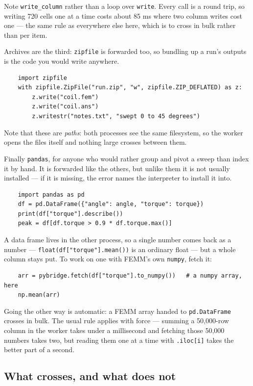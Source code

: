 Note {\tt write\_column} rather than a loop over {\tt write}.  Every call is a
round trip, so writing 720 cells one at a time costs about 85 ms where two
column writes cost one --- the same rule as everywhere else here, which is to
cross in bulk rather than per item.

Archives are the third: {\tt zipfile} is forwarded too, so bundling up a run's
outputs is the code you would write anywhere.

\begin{verbatim}
    import zipfile
    with zipfile.ZipFile("run.zip", "w", zipfile.ZIP_DEFLATED) as z:
        z.write("coil.fem")
        z.write("coil.ans")
        z.writestr("notes.txt", "swept 0 to 45 degrees")
\end{verbatim}

\noindent
Note that these are {\em paths}: both processes see the same filesystem, so
the worker opens the files itself and nothing large crosses between them.

Finally {\tt pandas}, for anyone who would rather group and pivot a sweep than
index it by hand.  It is forwarded like the others, but unlike them it is not
usually installed --- if it is missing, the error names the interpreter to
install it into.

\begin{verbatim}
    import pandas as pd
    df = pd.DataFrame({"angle": angle, "torque": torque})
    print(df["torque"].describe())
    peak = df[df.torque > 0.9 * df.torque.max()]
\end{verbatim}

A data frame lives in the other process, so a single number comes back as a
number --- \verb+float(df["torque"].mean())+ is an ordinary float --- but a
whole column stays put.  To work on one with FEMM's own {\tt numpy}, fetch it:

\begin{verbatim}
    arr = pybridge.fetch(df["torque"].to_numpy())   # a numpy array, here
    np.mean(arr)
\end{verbatim}

\noindent
Going the other way is automatic: a FEMM array handed to {\tt pd.DataFrame}
crosses in bulk.  The usual rule applies with force --- summing a 50,000-row
column in the worker takes under a millisecond and fetching those 50,000
numbers takes two, but reading them one at a time with {\tt .iloc[i]} takes
the better part of a second.

\subsection*{What crosses, and what does not}

